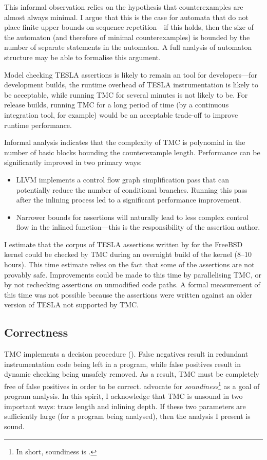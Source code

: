 This informal observation relies on the hypothesis that counterexamples are
almost always minimal. I argue that this is the case for automata that do not
place finite upper bounds on sequence repetition---if this holds, then the size
of the automaton (and therefore of minimal counterexamples) is bounded by the
number of separate statements in the automaton. A full analysis of automaton
structure may be able to formalise this argument.

Model checking TESLA assertions is likely to remain an  tool
for developers---for development builds, the runtime overhead of TESLA
instrumentation is likely to be acceptable, while running TMC for several
minutes is not likely to be. For release builds, running TMC for a long period
of time (by a continuous integration tool, for example) would be an acceptable
trade-off to improve runtime performance.

Informal analysis indicates that the complexity of TMC is polynomial in the
number of basic blocks bounding the counterexample length. Performance can be
significantly improved in two primary ways:
\begin{itemize}
  \item LLVM implements a control flow graph simplification pass that can
    potentially reduce the number of conditional branches. Running this pass
    after the inlining process led to a significant performance improvement.
  \item Narrower bounds for assertions will naturally lead to less complex
    control flow in the inlined function---this is the responsibility of the
    assertion author.
\end{itemize}

I estimate that the corpus of TESLA assertions written by
\textcite{anderson_tesla:_2014} for the FreeBSD kernel could be checked
by TMC during an overnight build of the kernel (8--10 hours). This time
estimate relies on the fact that some of the assertions are not provably
safe. Improvements could be made to this time by parallelising TMC, or
by not rechecking assertions on unmodified code paths. A formal
measurement of this time was not possible because the assertions were
written against an older version of TESLA not supported by TMC.

\subsection{Correctness}

TMC implements a decision procedure (). False negatives result in redundant instrumentation code being left
in a program, while false positives result in dynamic checking being unsafely
removed. As a result, TMC must be completely free of false positives in order to
be correct.  \textcite{livshits_defense_2015} advocate for
\emph{soundiness}\footnote{In short, soundiness is .} as a goal of program analysis. In this spirit, I
acknowledge that TMC is unsound in two important ways: trace length and inlining
depth. If these two parameters are sufficiently large (for a program being
analysed), then the analysis I present is sound.

